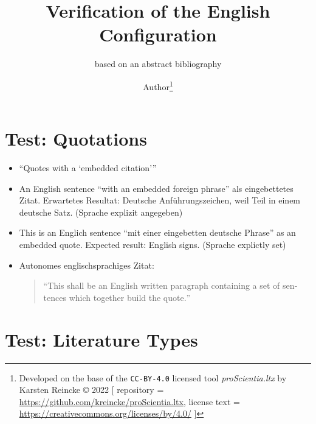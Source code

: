 \documentclass[
  DIV=calc,
  BCOR=5mm,
  11pt,
  headings=small,
  oneside,
  abstract=true,
  toc=bib,
  ngerman,english]{scrartcl}
\begin{document}
\nocite{*}

\titlehead{Bib\LaTeX}
\subject{Release 1.0}
\title{Verification of the English Configuration}
\subtitle{based on an abstract bibliography}
\author{Author\footnote{
Developed on the base of the \texttt{CC-BY-4.0} licensed tool \textit{proScientia.ltx} by Karsten Reincke \copyright{} 2022 [
repository = \href{https://github.com/kreincke/proScientia.ltx}{https://github.com/kreincke/proScientia.ltx},
license text = \href{https://creativecommons.org/licenses/by/4.0/}{https://creativecommons.org/licenses/by/4.0/} ]}
}


\maketitle

\footnotesize
\tableofcontents

\normalsize
\section{Test: Quotations}
\begin{itemize}

  \item \enquote{Quotes with a \enquote{embedded citation}}

  \item An English sentence \foreignquote{german}{with an embedded foreign phrase} als eingebettetes Zitat. Erwartetes Resultat: Deutsche Anführungszeichen, weil Teil in einem deutsche Satz. (Sprache explizit angegeben)

  \item This is an Englich sentence \foreignquote{english}{mit einer eingebetten deutsche Phrase} as an embedded quote. Expected result: English signs. (Sprache explictly set)

  \item Autonomes englischsprachiges Zitat:
  \begin{quote}\foreignquote{english}{This shall be an English written paragraph containing a set of sentences which together build the quote.}\end{quote}

\end{itemize}

\section{Test: Literature Types}
\end{document}
